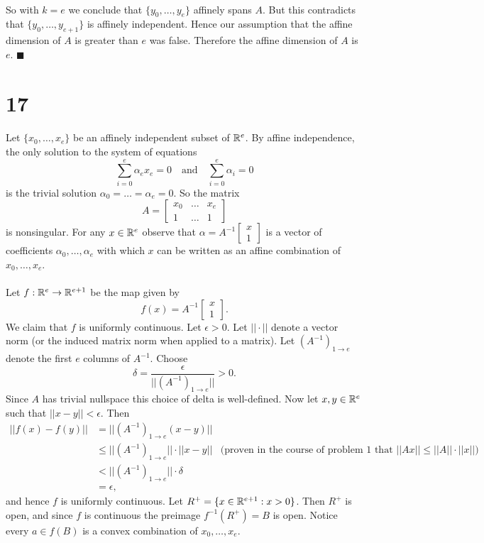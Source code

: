 \documentclass[letterpaper,12pt,oneside,onecolumn]{article}
\begin{document}
\paragraph{}
So with $k=e$ we conclude that $\{y_0, \dots, y_e\}$ affinely spans $A$. But this contradicts that $\{y_0, \dots, y_{e+1}\}$ is affinely independent. Hence our assumption that the affine dimension of $A$ is greater than $e$ was false. Therefore the affine dimension of $A$ is $e$. $\blacksquare$
\section*{17}
\paragraph{}
Let $\{x_0, \dots, x_e\}$ be an affinely independent subset of $\mathbb{R}^e$. By affine independence, the only solution to the system of equations
$$\sum_{i=0}^e \alpha_e x_e =0 \quad \text{and}\quad \sum_{i=0}^e\alpha_i = 0$$
is the trivial solution $\alpha_0 = \dots = \alpha_e = 0$. So the matrix $$A=\begin{bmatrix} x_0 &\dots & x_e\\ 1 & \dots & 1\end{bmatrix}$$
is nonsingular. For any $x \in \mathbb{R}^e$ observe that $\alpha=A^{-1}\begin{bmatrix}x\\1\end{bmatrix}$ is a vector of coefficients $\alpha_0, \dots, \alpha_e$ with which $x$ can be written as an affine combination of $x_0, \dots, x_e$.
\paragraph{}
Let $f : \mathbb{R}^e \rightarrow \mathbb{R}^{e+1}$ be the map given by $$f(x) = A^{-1}\begin{bmatrix}x\\1\end{bmatrix}.$$ We claim that $f$ is uniformly continuous. Let $\epsilon >0$. Let $||\cdot || $ denote a vector norm (or the induced matrix norm when applied to a matrix). Let $(A^{-1})_{1\rightarrow e}$ denote the first $e$ columns of $A^{-1}$. Choose $$\delta = \frac{\epsilon}{||(A^{-1})_{1\rightarrow e}||} > 0.$$ Since $A$ has trivial nullspace this choice of delta is well-defined. Now let $x,y \in \mathbb{R}^e$ such that $||x-y|| < \epsilon$. Then
\begin{align*}
||f(x) - f(y)|| &= ||(A^{-1})_{1\rightarrow e}(x-y)|| \\
&\leq ||(A^{-1})_{1\rightarrow e}|| \cdot ||x-y||  &\text{(proven in the course of problem $1$ that $||Ax|| \leq ||A|| \cdot ||x||$)}\\
&< ||(A^{-1})_{1\rightarrow e}|| \cdot \delta \\
&= \epsilon,
\end{align*}
and hence $f$ is uniformly continuous. Let $R^+ = \{x \in \mathbb{R}^{e+1} : x > 0 \}$. Then $R^+$ is open, and since $f$ is continuous the preimage $f^{-1}(R^+) = B$ is open. Notice every $a \in f(B)$ is a convex combination of $x_0, \dots, x_e$.
\end{document}
